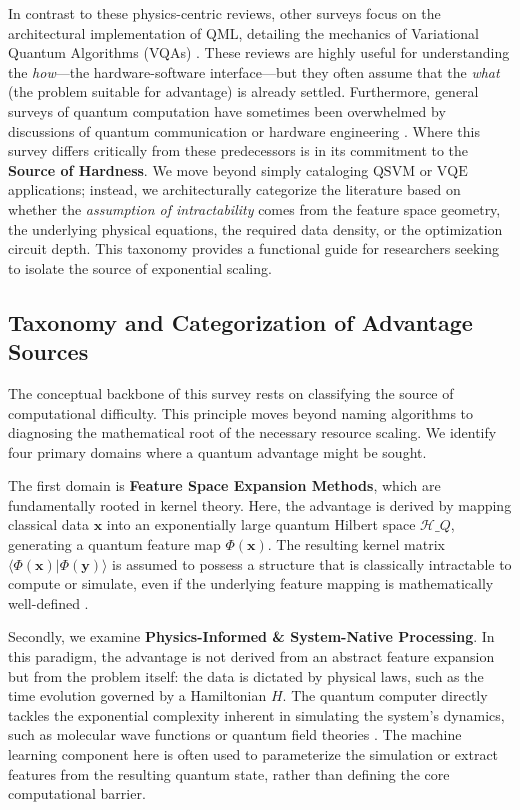 \documentclass{article}
\begin{document}
In contrast to these physics-centric reviews, other surveys focus on the architectural implementation of QML, detailing the mechanics of Variational Quantum Algorithms (VQAs) \cite{cerezo2021variational}. These reviews are highly useful for understanding the \textit{how}---the hardware-software interface---but they often assume that the \textit{what} (the problem suitable for advantage) is already settled. Furthermore, general surveys of quantum computation have sometimes been overwhelmed by discussions of quantum communication  or hardware engineering \cite{bharti2022noisy}. Where this survey differs critically from these predecessors is in its commitment to the \textbf{Source of Hardness}. We move beyond simply cataloging $\text{QSVM}$ or $\text{VQE}$ applications; instead, we architecturally categorize the literature based on whether the \textit{assumption of intractability} comes from the feature space geometry, the underlying physical equations, the required data density, or the optimization circuit depth. This taxonomy provides a functional guide for researchers seeking to isolate the source of exponential scaling.

\subsection{Taxonomy and Categorization of Advantage Sources}

\label{sec:taxonomy\_and\_categorization\_of\_advantage}

The conceptual backbone of this survey rests on classifying the source of computational difficulty. This principle moves beyond naming algorithms to diagnosing the mathematical root of the necessary resource scaling. We identify four primary domains where a quantum advantage might be sought.

The first domain is \textbf{Feature Space Expansion Methods}, which are fundamentally rooted in kernel theory. Here, the advantage is derived by mapping classical data $\mathbf{x}$ into an exponentially large quantum Hilbert space $\mathcal{H}\_Q$, generating a quantum feature map $\Phi(\mathbf{x})$. The resulting kernel matrix $\langle \Phi(\mathbf{x}) | \Phi(\mathbf{y}) \rangle$ is assumed to possess a structure that is classically intractable to compute or simulate, even if the underlying feature mapping is mathematically well-defined \cite{jager2023universal}.

Secondly, we examine \textbf{Physics-Informed \& System-Native Processing}. In this paradigm, the advantage is not derived from an abstract feature expansion but from the problem itself: the data is dictated by physical laws, such as the time evolution governed by a Hamiltonian $H$. The quantum computer directly tackles the exponential complexity inherent in simulating the system's dynamics, such as molecular wave functions or quantum field theories . The machine learning component here is often used to parameterize the simulation or extract features from the resulting quantum state, rather than defining the core computational barrier.
\end{document}
